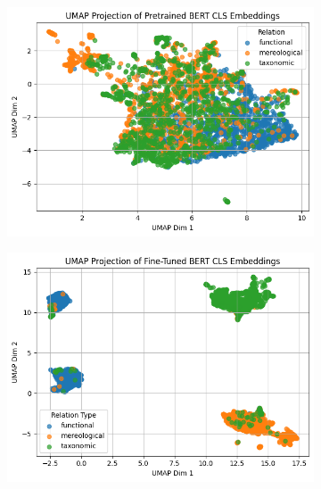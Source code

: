 \documentclass[stu,floatsintext]{apa7}
\begin{document}
\medskip
\begin{figure}[h]
  \caption{UMAP projections of \texttt{[CLS]} token embeddings from pretrained (left) and fine-tuned (right) BERT models.}
  \centering
  \begin{subfigure}[b]{0.45\textwidth}
    \centering
    \includegraphics[width=\linewidth]{umap-pretrained.png}
  \end{subfigure}
  \hfill
  \begin{subfigure}[b]{0.45\textwidth}
    \centering
    \includegraphics[width=\linewidth]{umap-finetuned.png}
  \end{subfigure}
  \label{fig:umap}
\end{figure}
\end{document}
